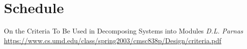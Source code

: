\documentclass[11pt, oneside]{article}
\begin{document}
\newpage
\section{Schedule}



\newpage
\begin{thebibliography}{9}
On the Criteria To Be Used in Decomposing Systems into Modules 
\textit{D.L. Parnas}
\url{https://www.cs.umd.edu/class/spring2003/cmsc838p/Design/criteria.pdf}


 
\end{thebibliography}
\end{document}
